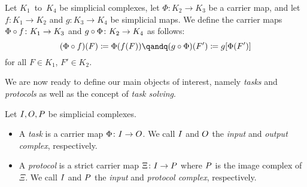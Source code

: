 \begin{thDef}
    Let $K_1$~to~$K_4$ be simplicial complexes,
    let $\Phi\colon K_2\to K_3$ be a carrier map, and let
    $f\colon K_1\to K_2$ and $g\colon K_3\to K_4$ be simplicial
    maps. We define the carrier maps
    $\Phi\after f\colon K_1\to K_3$ and $g\after\Phi\colon K_2\to K_4$
    as follows:
    \[ (\Phi\after f)(F) \defeq \Phi(f(F))
        \qandq
        (g\after \Phi)(F') \defeq g[\Phi(F')]
    \]
    for all $F\in K_1$, $F'\in K_2$.
\end{thDef}

We are now ready to define our main objects of interest, namely \emph{tasks}
and \emph{protocols} as well as the concept of \emph{task solving}.

\begin{thDef}
    \label{ch2:def:taskprotocol}
    Let $I,O,P$ be simplicial complexes.
    \begin{itemize}
        \item
            A \emph{task} is a carrier map $\Phi\colon I\to O$.
            We call $I$ and $O$ the \emph{input} and \emph{output complex},
            respectively.
            
        \item
            A \emph{protocol} is a strict carrier map $\Xi\colon I\to P$
            where $P$ is the image complex of~$\Xi$.
            We call $I$ and $P$ the \emph{input} and \emph{protocol
            complex}, respectively.
    \end{itemize}
\end{thDef}

